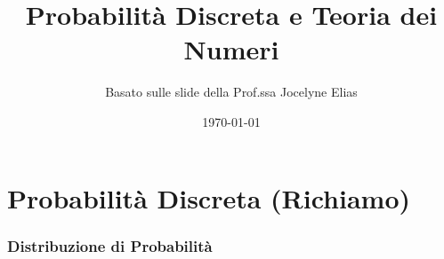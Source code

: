 

\title{Probabilità Discreta e Teoria dei Numeri}
\author{Basato sulle slide della Prof.ssa Jocelyne Elias}
\date{\today}



\maketitle
\tableofcontents
\newpage

\part{Probabilità Discreta (Richiamo)}

\section{Distribuzione di Probabilità}

